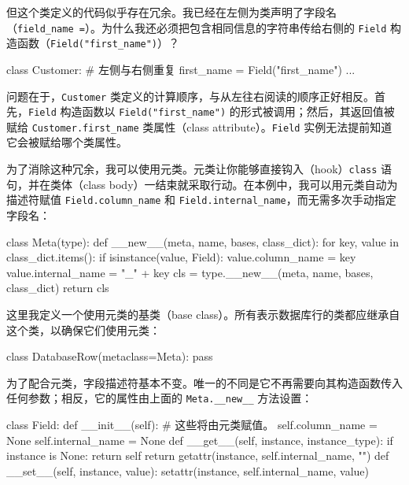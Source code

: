 但这个类定义的代码似乎存在冗余。我已经在左侧为类声明了字段名（\texttt{field\_name =}）。为什么我还必须把包含相同信息的字符串传给右侧的 \texttt{Field} 构造函数（\texttt{Field("first\_name")}）？

\begin{codebox}[python]
class Customer:
    # 左侧与右侧重复
    first_name = Field("first_name")
    ...
\end{codebox}

问题在于，\texttt{Customer} 类定义的计算顺序，与从左往右阅读的顺序正好相反。首先，\texttt{Field} 构造函数以 \texttt{Field("first\_name")} 的形式被调用；然后，其返回值被赋给 \texttt{Customer.first\_name} 类属性（class attribute）。\texttt{Field} 实例无法提前知道它会被赋给哪个类属性。

为了消除这种冗余，我可以使用元类。元类让你能够直接钩入（hook）\texttt{class} 语句，并在类体（class body）一结束就采取行动。在本例中，我可以用元类自动为描述符赋值 \texttt{Field.column\_name} 和 \texttt{Field.internal\_name}，而无需多次手动指定字段名：

\begin{codebox}[python]
class Meta(type):
    def __new__(meta, name, bases, class_dict):
        for key, value in class_dict.items():
            if isinstance(value, Field):
                value.column_name = key
                value.internal_name = "_" + key
        cls = type.__new__(meta, name, bases, class_dict)
        return cls
\end{codebox}

这里我定义一个使用元类的基类（base class）。所有表示数据库行的类都应继承自这个类，以确保它们使用元类：

\begin{codebox}[python]
class DatabaseRow(metaclass=Meta):
    pass
\end{codebox}

为了配合元类，字段描述符基本不变。唯一的不同是它不再需要向其构造函数传入任何参数；相反，它的属性由上面的 \texttt{Meta.\_\_new\_\_} 方法设置：

\begin{codebox}[python]
class Field:
    def __init__(self):
        # 这些将由元类赋值。
        self.column_name = None
        self.internal_name = None
    def __get__(self, instance, instance_type):
        if instance is None:
            return self
        return getattr(instance, self.internal_name, "")
    def __set__(self, instance, value):
        setattr(instance, self.internal_name, value)
\end{codebox}

